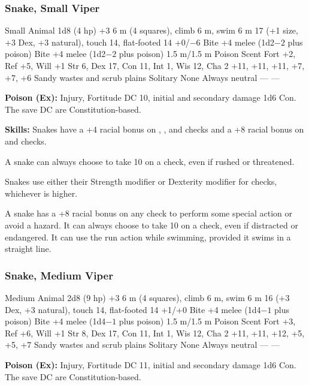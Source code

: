 \subsubsection{Snake, Small Viper}
\begin{MonsterStats}
{Small Animal}
{1d8 (4 hp)}
{+3}
{6 m (4 squares), climb 6 m, swim 6 m}
{17 (+1 size, +3 Dex, +3 natural), touch 14, flat-footed 14}
{+0/$-6$}
{Bite +4 melee (1d2$-2$ plus poison)}
{Bite +4 melee (1d2$-2$ plus poison)}
{1.5 m/1.5 m}
{Poison}
{Scent}
{Fort +2, Ref +5, Will +1}
{Str 6, Dex 17, Con 11, Int 1, Wis 12, Cha 2}
{ +11,  +11,  +11,  +7,  +7,  +6}
{}
{Sandy wastes and scrub plains}
{Solitary}
{\onehalf}
{None}
{Always neutral}
{---}
{---}
\end{MonsterStats}

\textbf{Poison (Ex):} Injury, Fortitude DC 10, initial and secondary damage 1d6 Con. The save DC are Constitution-based.

\textbf{Skills:} Snakes have a +4 racial bonus on , , and  checks and a +8 racial bonus on  and  checks.

A snake can always choose to take 10 on a  check, even if rushed or threatened.

Snakes use either their Strength modifier or Dexterity modifier for  checks, whichever is higher.

A snake has a +8 racial bonus on any  check to perform some special action or avoid a hazard. It can always choose to take 10 on a  check, even if distracted or endangered. It can use the run action while swimming, provided it swims in a straight line.

\subsubsection{Snake, Medium Viper}
\begin{MonsterStats}
{Medium Animal}
{2d8 (9 hp)}
{+3}
{6 m (4 squares), climb 6 m, swim 6 m}
{16 (+3 Dex, +3 natural), touch 14, flat-footed 14}
{+1/+0}
{Bite +4 melee (1d4$-1$ plus poison)}
{Bite +4 melee (1d4$-1$ plus poison)}
{1.5 m/1.5 m}
{Poison}
{Scent}
{Fort +3, Ref +6, Will +1}
{Str 8, Dex 17, Con 11, Int 1, Wis 12, Cha 2}
{ +11,  +11,  +12,  +5,  +5,  +7}
{}
{Sandy wastes and scrub plains}
{Solitary}
{\onehalf}
{None}
{Always neutral}
{---}
{---}
\end{MonsterStats}
\textbf{Poison (Ex):} Injury, Fortitude DC 11, initial and secondary damage 1d6 Con. The save DC are Constitution-based.

